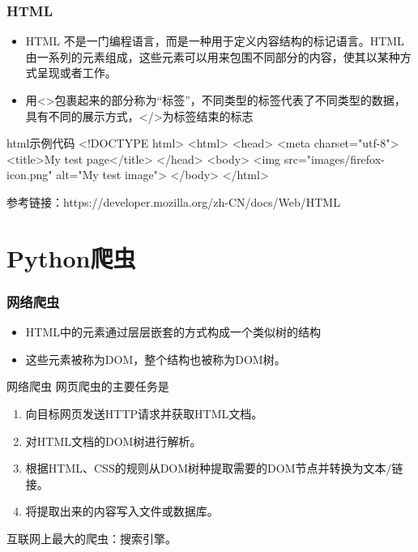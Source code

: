 \documentclass[9pt]{beamer}
\begin{document}
\begin{frame}[fragile]
\frametitle{HTML}

\begin{itemize}
    \item HTML 不是一门编程语言，而是一种用于定义内容结构的标记语言。HTML由一系列的元素组成，这些元素可以用来包围不同部分的内容，使其以某种方式呈现或者工作。
    \item 用<>包裹起来的部分称为``标签''，不同类型的标签代表了不同类型的数据，具有不同的展示方式，</>为标签结束的标志
\end{itemize}

\begin{codebox}{html}{示例代码}
<!DOCTYPE html>
<html>
  <head>
  <meta charset="utf-8">
  <title>My test page</title>
  </head>
  <body>
    <img src="images/firefox-icon.png" alt="My test image">
  </body>
</html>
\end{codebox}


参考链接：https://developer.mozilla.org/zh-CN/docs/Web/HTML
\end{frame}

\section{Python爬虫}
\begin{frame}
    \frametitle{网络爬虫}

\begin{itemize}
    \item HTML中的元素通过层层嵌套的方式构成一个类似树的结构
    \item 这些元素被称为DOM，整个结构也被称为DOM树。
\end{itemize}

\begin{block}{网络爬虫}
网页爬虫的主要任务是
\begin{enumerate}
    \item 向目标网页发送HTTP请求并获取HTML文档。
    \item 对HTML文档的DOM树进行解析。
    \item 根据HTML、CSS的规则从DOM树种提取需要的DOM节点并转换为文本/链接。
    \item 将提取出来的内容写入文件或数据库。 
\end{enumerate}

互联网上最大的爬虫：搜索引擎。
\end{block}

\end{frame}
\end{document}
